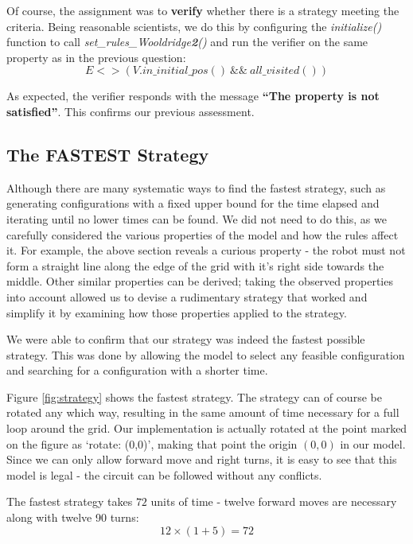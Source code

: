 \documentclass{article}
\begin{document}
Of course, the assignment was to \textbf{verify} whether there is a strategy meeting the criteria.
Being reasonable scientists, we do this by configuring the \textit{initialize()} function to call \textit{set\_rules\_Wooldridge\textbf{2}()} and run the verifier on the same property as in the previous question:
\[ E<>(V.in\_initial\_pos() ~ \&\& ~ all\_visited()) \]

As expected, the verifier responds with the message \textbf{``The property is not satisfied''}.
This confirms our previous assessment.

\subsection{The FASTEST Strategy}

Although there are many systematic ways to find the fastest strategy, such as generating configurations with a fixed upper bound for the time elapsed and iterating until no lower times can be found.
We did not need to do this, as we carefully considered the various properties of the model and how the rules affect it.
For example, the above section reveals a curious property \-- the robot must not form a straight line along the edge of the grid with it's right side towards the middle.
Other similar properties can be derived; taking the observed properties into account allowed us to devise a rudimentary strategy that worked and simplify it by examining how those properties applied to the strategy. 

We were able to confirm that our strategy was indeed the fastest possible strategy. This was done by allowing the model to select any feasible configuration and searching for a configuration with a shorter time.

Figure \ref{fig:strategy} shows the fastest strategy. The strategy can of course be rotated any which way, resulting in the same amount of time necessary for a full loop around the grid.
Our implementation is actually rotated at the point marked on the figure as `rotate: (0,0)', making that point the origin $(0,0)$ in our model.
Since we can only allow forward move and right turns, it is easy to see that this model is legal
\-- the circuit can be followed without any conflicts.

The fastest strategy takes $72$ units of time \-- twelve forward moves are necessary along with twelve 90\degree{} turns:
\[ 12 \times ( 1 + 5 ) = 72 \]
\end{document}
